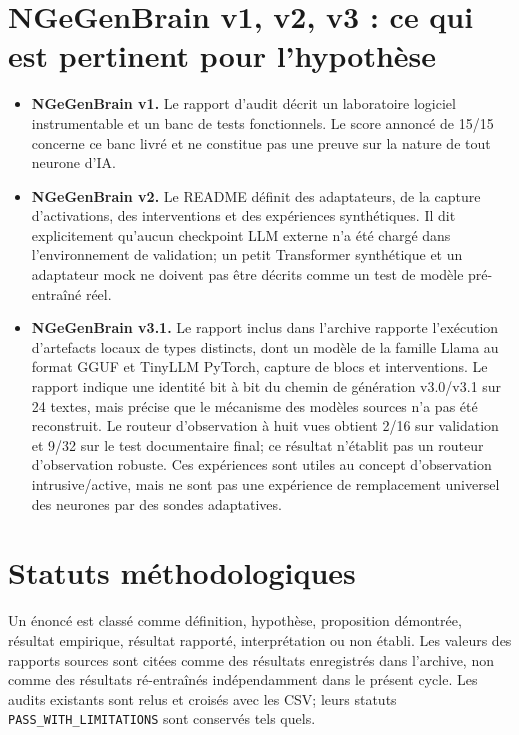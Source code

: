 \documentclass[11pt,a4paper,oneside]{report}
\begin{document}
\section{NGeGenBrain v1, v2, v3 : ce qui est pertinent pour l'hypothèse}
\begin{itemize}
\item \textbf{NGeGenBrain v1.} Le rapport d'audit décrit un laboratoire logiciel instrumentable et un banc de tests fonctionnels. Le score annoncé de 15/15 concerne ce banc livré et ne constitue pas une preuve sur la nature de tout neurone d'IA.
\item \textbf{NGeGenBrain v2.} Le README définit des adaptateurs, de la capture d'activations, des interventions et des expériences synthétiques. Il dit explicitement qu'aucun checkpoint LLM externe n'a été chargé dans l'environnement de validation; un petit Transformer synthétique et un adaptateur mock ne doivent pas être décrits comme un test de modèle pré-entraîné réel.
\item \textbf{NGeGenBrain v3.1.} Le rapport inclus dans l'archive rapporte l'exécution d'artefacts locaux de types distincts, dont un modèle de la famille Llama au format GGUF et TinyLLM PyTorch, capture de blocs et interventions. Le rapport indique une identité bit à bit du chemin de génération v3.0/v3.1 sur 24 textes, mais précise que le mécanisme des modèles sources n'a pas été reconstruit. Le routeur d'observation à huit vues obtient 2/16 sur validation et 9/32 sur le test documentaire final; ce résultat n'établit pas un routeur d'observation robuste. Ces expériences sont utiles au concept d'observation intrusive/active, mais ne sont pas une expérience de remplacement universel des neurones par des sondes adaptatives.
\end{itemize}

\section{Statuts méthodologiques}
Un énoncé est classé comme définition, hypothèse, proposition démontrée, résultat empirique, résultat rapporté, interprétation ou non établi. Les valeurs des rapports sources sont citées comme des résultats enregistrés dans l'archive, non comme des résultats ré-entraînés indépendamment dans le présent cycle. Les audits existants sont relus et croisés avec les CSV; leurs statuts \texttt{PASS\_WITH\_LIMITATIONS} sont conservés tels quels.
\end{document}
